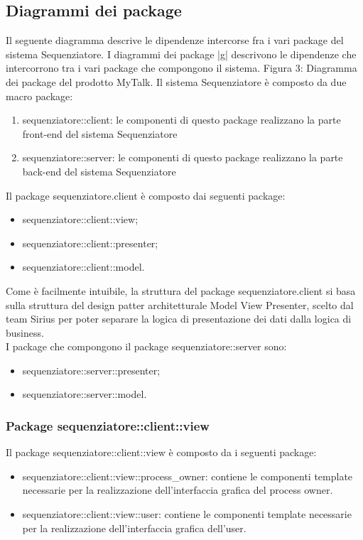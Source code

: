 \subsection{Diagrammi dei package}
Il seguente diagramma descrive le dipendenze intercorse fra i vari package del sistema Sequenziatore.
I diagrammi dei package |g| descrivono le dipendenze che intercorrono tra i vari
package che compongono il sistema.
Figura 3: Diagramma dei package del prodotto MyTalk.
Il sistema Sequenziatore è composto da due macro package:
\begin{enumerate}
	\item sequenziatore::client: le componenti di questo package realizzano la parte front-end del sistema Sequenziatore 
	\item sequenziatore::server: le componenti di questo package realizzano la parte back-end del sistema Sequenziatore 
\end{enumerate}
Il package sequenziatore.client è composto dai seguenti package:
\begin{itemize}
	\item sequenziatore::client::view;
	\item sequenziatore::client::presenter;
	\item sequenziatore::client::model.
\end{itemize}
Come è facilmente intuibile, la struttura del package sequenziatore.client si basa sulla struttura del design patter
architetturale Model View Presenter, scelto dal team Sirius per poter separare la logica di presentazione dei dati dalla logica di business.\\
I package che compongono il package sequenziatore::server sono:
\begin{itemize}
	\item sequenziatore::server::presenter;
	\item sequenziatore::server::model.
\end{itemize}
\subsubsection{Package sequenziatore::client::view}
Il package sequenziatore::client::view è composto da i seguenti package:
\begin{itemize}
	\item sequenziatore::client::view::process_owner: contiene le componenti template necessarie per la realizzazione dell’interfaccia grafica del process owner.
	\item sequenziatore::client::view::user: contiene le componenti template necessarie per la realizzazione dell’interfaccia grafica dell'user.
\end{itemize}
